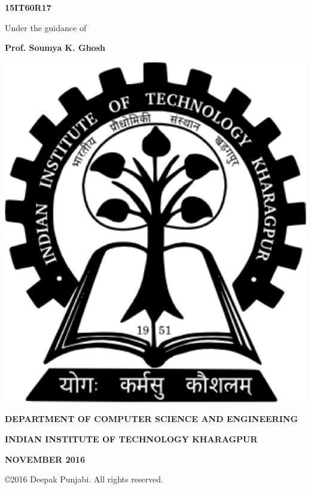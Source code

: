  \vspace{-3em}
\begin{center}
 \large{\textbf{15IT60R17}}
\end{center}
 \vspace{-1em}
\begin{center}
 Under the guidance of
\end{center}
 \vspace{-2.5em}
\begin{center}
 \large \textbf{Prof. Soumya K. Ghosh}
\end{center}
 \vspace{0em}
\begin{center}
\includegraphics[scale=0.2]{iitlogo.pdf}
\end{center}
 \vspace{-1em}
\begin{center}
 \textbf{\small DEPARTMENT OF COMPUTER SCIENCE AND ENGINEERING}
\end{center}
 \vspace{-3em}
\begin{center}
 \textbf{\small INDIAN INSTITUTE OF TECHNOLOGY KHARAGPUR} 
\end{center}
 \vspace{-3em}
\begin{center}
 \textbf{\small NOVEMBER 2016}
\end{center}
 \vspace{-1em}
\begin{center}
 \copyright 2016 Deepak Punjabi. All rights reserved.
\end{center}

\clearpage
